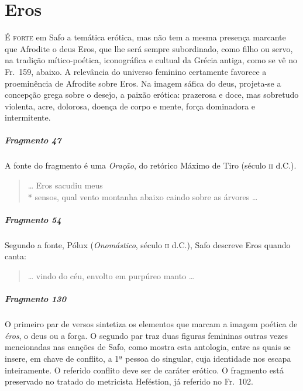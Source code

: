 \chapter{Eros}

\textsc{É forte} em Safo a temática erótica, mas não tem a mesma presença marcante que
Afrodite o deus Eros, que lhe será sempre subordinado, como filho ou servo, na
tradição mítico-poética, iconográfica e cultual da Grécia antiga, como se vê no
Fr.~159, abaixo. A relevância do universo feminino certamente favorece a
proeminência de Afrodite sobre Eros. Na imagem sáfica do deus, projeta-se a
concepção grega sobre o desejo, a paixão erótica: prazerosa e doce, mas
sobretudo violenta, acre, dolorosa, doença de corpo e mente, força dominadora e
intermitente.

\paragraph{Fragmento 47}

{\small A fonte do fragmento é uma \textit{Oração}, do retórico Máximo de Tiro (século
\textsc{ii} d.C.).}

\begin{verse}
\ldots{} Eros sacudiu meus\\*
sensos, qual vento montanha abaixo caindo \qb{}sobre as árvores \ldots{}
\end{verse}

\paragraph{Fragmento 54}

{\small Segundo a fonte, Pólux (\textit{Onomástico}, século \textsc{ii} d.C.), Safo descreve Eros
quando canta:}

\begin{verse}
\ldots{} vindo do céu, envolto em purpúreo manto \ldots{}
\end{verse}

\paragraph{Fragmento 130}

{\small O primeiro par de versos sintetiza os elementos que marcam a imagem poética de
\textit{éros}, o deus ou a força. O segundo par traz duas figuras femininas
outras vezes mencionadas nas canções de Safo, como mostra esta antologia, entre
as quais se insere, em chave de conflito, a 1ª pessoa do singular, cuja
identidade nos escapa inteiramente. O referido conflito deve ser de caráter
erótico. O fragmento está preservado no tratado do metricista Heféstion, já
referido no Fr.~102.}


